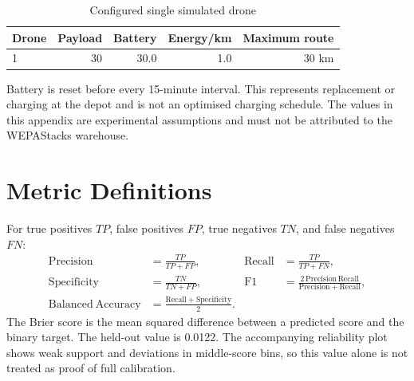 \documentclass[10pt]{article}
\begin{document}
\begin{table}[H]
\centering
\caption{Configured single simulated drone}
\small
\begin{tabular}{lrrrr}
\toprule
Drone & Payload & Battery & Energy/km & Maximum route \\
\midrule
1 & 30 & 30.0 & 1.0 & 30 km \\
\bottomrule
\end{tabular}
\end{table}

Battery is reset before every 15-minute interval. This represents replacement or charging at the depot and is not an optimised charging schedule. The values in this appendix are experimental assumptions and must not be attributed to the WEPAStacks warehouse.

\section{Metric Definitions}

For true positives $TP$, false positives $FP$, true negatives $TN$, and false negatives $FN$:
\begin{align}
\mathrm{Precision} &= \frac{TP}{TP+FP}, &
\mathrm{Recall} &= \frac{TP}{TP+FN},\\
\mathrm{Specificity} &= \frac{TN}{TN+FP}, &
\mathrm{F1} &= \frac{2\,\mathrm{Precision}\,\mathrm{Recall}}
{\mathrm{Precision}+\mathrm{Recall}},\\
\mathrm{Balanced\ Accuracy} &= \frac{\mathrm{Recall}+\mathrm{Specificity}}{2}.
\end{align}
The Brier score is the mean squared difference between a predicted score and the binary target. The held-out value is 0.0122. The accompanying reliability plot shows weak support and deviations in middle-score bins, so this value alone is not treated as proof of full calibration.
\end{document}
